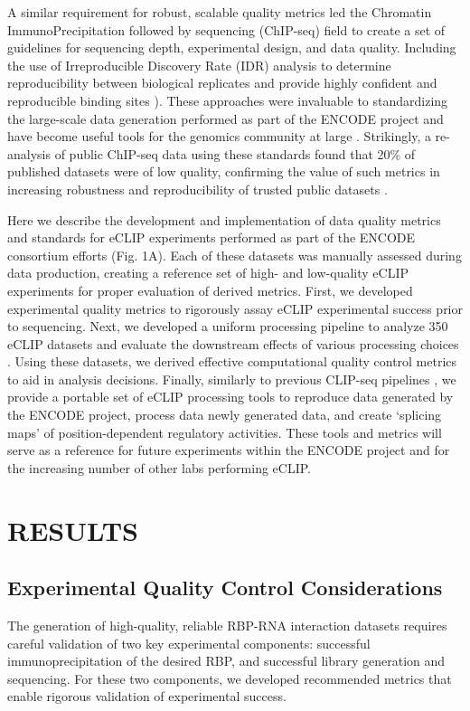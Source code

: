 A similar requirement for robust, scalable quality metrics led the Chromatin ImmunoPrecipitation followed by sequencing (ChIP-seq) field to create a set of guidelines for sequencing depth, experimental design, and data quality. Including the use of Irreproducible Discovery Rate (IDR) analysis to determine reproducibility between biological replicates and provide highly confident and reproducible binding sites \cite{Li2011,Kharchenko2008,Jung2014}). These approaches were invaluable to standardizing the large-scale data generation performed as part of the ENCODE project and have become useful tools for the genomics community at large \cite{Dunham2012,Landt2012}. Strikingly, a re-analysis of public ChIP-seq data using these standards found that 20\% of published datasets were of low quality, confirming the value of such metrics in increasing robustness and reproducibility of trusted public datasets \cite{Marinov2013}.

Here we describe the development and implementation of data quality metrics and standards for eCLIP experiments performed as part of the ENCODE consortium efforts (Fig. 1A). Each of these datasets was manually assessed during data production, creating a reference set of high- and low-quality eCLIP experiments for proper evaluation of derived metrics. First, we developed experimental quality metrics to rigorously assay eCLIP experimental success prior to sequencing. Next, we developed a uniform processing pipeline to analyze 350 eCLIP datasets and evaluate the downstream effects of various processing choices \cite{VanNostrand2016}. Using these datasets, we derived effective computational quality control metrics to aid in analysis decisions. Finally, similarly to previous CLIP-seq pipelines \cite{Wang2014,Zhang2011,Uren2012,Althammer2011,Lovci2013,Corcoran2011}, we provide a portable set of eCLIP processing tools to reproduce data generated by the ENCODE project, process data newly generated data, and create ‘splicing maps’ of position-dependent regulatory activities. These tools and metrics will serve as a reference for future experiments within the ENCODE project and for the increasing number of other labs performing eCLIP.
 
\section{RESULTS}

\subsection{Experimental Quality Control Considerations}
The generation of high-quality, reliable RBP-RNA interaction datasets requires careful validation of two key experimental components: successful immunoprecipitation of the desired RBP, and successful library generation and sequencing. For these two components, we developed recommended metrics that enable rigorous validation of experimental success.

